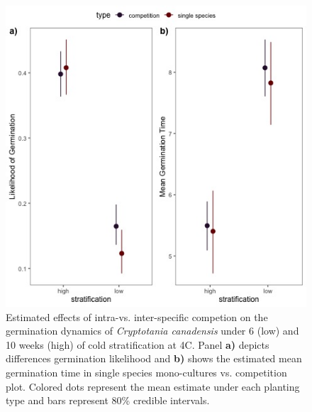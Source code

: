 \documentclass{article}\usepackage[]{graphicx}\usepackage[]{color}
\begin{document}
{\begin{figure}[h!]
    \centering
\includegraphics[width=\textwidth]{..//figure/nichemodfication.jpeg}
   \caption{Estimated effects of intra-vs. inter-specific competion on the germination dynamics of \textit{Cryptotania canadensis} under 6 (low) and 10 weeks (high) of cold stratification at 4\degree C. Panel \textbf{a)} depicts differences germination likelihood and \textbf{b)} shows the estimated mean germination time in single species mono-cultures vs. competition plot. Colored dots represent the mean estimate under each planting type and bars represent 80\% credible intervals. } 
   \label{fig:nichemod}
\end{figure}

}
\end{document}
